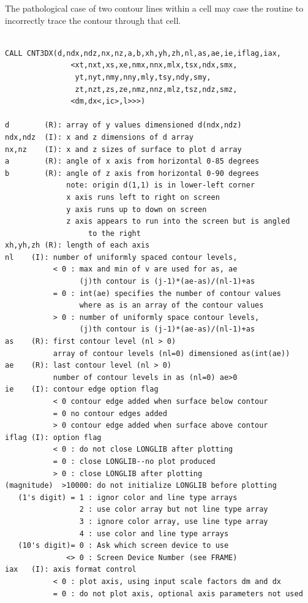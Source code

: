 \documentclass[11pt]{report}
\begin{document}
The pathological case of two contour lines within a cell may case the
routine to incorrectly trace the contour through that cell.
\begin{verbatim}

CALL CNT3DX(d,ndx,ndz,nx,nz,a,b,xh,yh,zh,nl,as,ae,ie,iflag,iax,
               <xt,nxt,xs,xe,nmx,nnx,mlx,tsx,ndx,smx,
                yt,nyt,nmy,nny,mly,tsy,ndy,smy,
                zt,nzt,zs,ze,nmz,nnz,mlz,tsz,ndz,smz,
               <dm,dx<,ic>,l>>>)

d        (R): array of y values dimensioned d(ndx,ndz)
ndx,ndz  (I): x and z dimensions of d array
nx,nz    (I): x and z sizes of surface to plot d array
a        (R): angle of x axis from horizontal 0-85 degrees
b        (R): angle of z axis from horizontal 0-90 degrees
              note: origin d(1,1) is in lower-left corner
              x axis runs left to right on screen
              y axis runs up to down on screen
              z axis appears to run into the screen but is angled
                   to the right
xh,yh,zh (R): length of each axis
nl    (I): number of uniformly spaced contour levels,
           < 0 : max and min of v are used for as, ae
                 (j)th contour is (j-1)*(ae-as)/(nl-1)+as
           = 0 : int(ae) specifies the number of contour values
                 where as is an array of the contour values
           > 0 : number of uniformly space contour levels,
                 (j)th contour is (j-1)*(ae-as)/(nl-1)+as
as    (R): first contour level (nl > 0)
           array of contour levels (nl=0) dimensioned as(int(ae))
ae    (R): last contour level (nl > 0)
           number of contour levels in as (nl=0) ae>0
ie    (I): contour edge option flag
           < 0 contour edge added when surface below contour
           = 0 no contour edges added
           > 0 contour edge added when surface above contour
iflag (I): option flag
           < 0 : do not close LONGLIB after plotting
           = 0 : close LONGLIB--no plot produced
           > 0 : close LONGLIB after plotting
(magnitude)  >10000: do not initialize LONGLIB before plotting
   (1's digit) = 1 : ignor color and line type arrays
                 2 : use color array but not line type array
                 3 : ignore color array, use line type array
                 4 : use color and line type arrays
   (10's digit)= 0 : Ask which screen device to use
              <> 0 : Screen Device Number (see FRAME)
iax   (I): axis format control
           < 0 : plot axis, using input scale factors dm and dx
           = 0 : do not plot axis, optional axis parameters not used

\end{verbatim}
\end{document}
